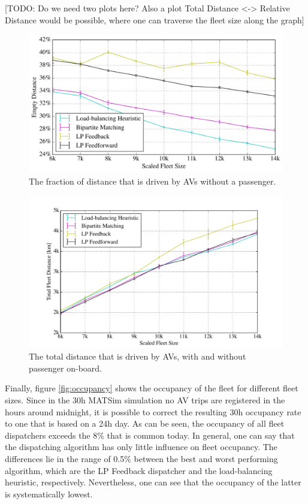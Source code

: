 [TODO: Do we need two plots here? Also a plot Total Distance <-> Relative Distance
would be possible, where one can traverse the fleet size along the graph]

\begin{figure}
\includegraphics[width=1.0\textwidth]{figures/empty_rides.pdf}
\caption{The fraction of distance that is driven by AVs without a passenger.}
\label{fig:empty_rides}
\end{figure}

\begin{figure}
\includegraphics[width=1.0\textwidth]{figures/total_distance.pdf}
\caption{The total distance that is driven by AVs, with and without passenger on-board.}
\label{fig:total_distance}
\end{figure}

Finally, figure \ref{fig:occupancy} shows the occupancy of the fleet for different
fleet sizes. Since in the 30h MATSim simulation no AV trips are registered in
the hours around midnight, it is possible to correct the resulting 30h occupancy
rate to one that is based on a 24h day. As can be seen, the occupancy of all
fleet dispatchers exceeds the 8\% that is common today. In general, one can say
that the dispatching algorithm has only little influence on fleet occupancy. The
differences lie in the range of 0.5\% between the best and worst performing algorithm,
which are the LP Feedback dispatcher and the load-balancing heuristic, respectively.
Nevertheless, one can see that the occupancy of the latter is systematically lowest.

